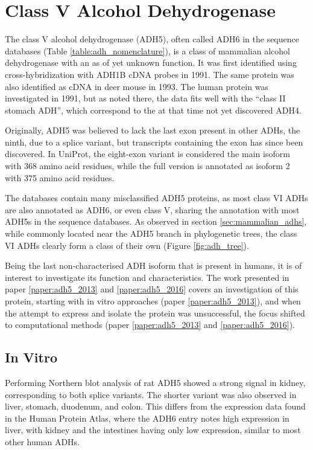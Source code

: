 \documentclass[a4paper, twoside, 12pt, openright]{report}
\begin{document}
\section{Class V Alcohol Dehydrogenase}
\label{sec:adh5}

The class V alcohol dehydrogenase (ADH5), often called ADH6 in the sequence databases (Table \ref{table:adh_nomenclature}), is a class of mammalian alcohol dehydrogenase with an as of yet unknown function. It was first identified using cross-hybridization with ADH1B cDNA probes in 1991\cite{yasunami_human_1991}. The same protein was also identified as cDNA in deer mouse in 1993\cite{zheng_molecular_1993}. The human protein was investigated in 1991\cite{chen_enzymatic_1991}, but as noted there, the data fits well with the ``class II stomach ADH'', which correspond to the at that time not yet discovered ADH4.

Originally, ADH5 was believed to lack the last exon present in other ADHs, the ninth, due to a splice variant, but transcripts containing the exon has since been discovered\cite{stromberg_human_2000}. In UniProt, the eight-exon variant is considered the main isoform with 368 amino acid residues, while the full version is annotated as isoform 2 with 375 amino acid residues.

The databases contain many misclassified ADH5 proteins, as most class VI ADHs are also annotated as ADH6, or even class V, sharing the annotation with most ADH5s in the sequence databases. As observed in section \ref{sec:mammalian_adhs}, while commonly located near the ADH5 branch in phylogenetic trees, the class VI ADHs clearly form a class of their own (Figure \ref{fig:adh_tree}).

Being the last non-characterised ADH isoform that is present in humans, it is of interest to investigate its function and characteristics. The work presented in paper \ref{paper:adh5_2013} and \ref{paper:adh5_2016} covers an investigation of this protein, starting with in vitro approaches (paper \ref{paper:adh5_2013}), and when the attempt to express and isolate the protein was unsuccessful, the focus shifted to computational methods (paper \ref{paper:adh5_2013} and \ref{paper:adh5_2016}).


\subsection{In Vitro}
\label{sec:adh5_vitro}

Performing Northern blot analysis of rat ADH5 showed a strong signal in kidney, corresponding to both splice variants. The shorter variant was also observed in liver, stomach, duodenum, and colon. This differs from the expression data found in the Human Protein Atlas\cite{uhlen_tissue-based_2015}, where the ADH6 entry notes high expression in liver, with kidney and the intestines having only low expression, similar to most other human ADHs. 
\end{document}
